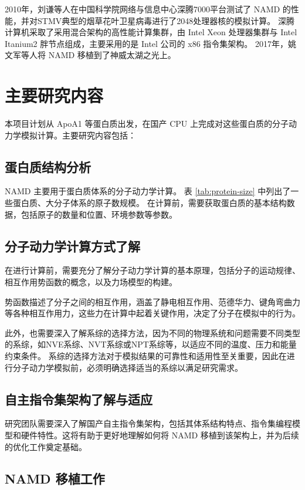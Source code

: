 2010年，刘谦等人在中国科学院网络与信息中心深腾7000平台测试了 NAMD 的性能，并对STMV典型的烟草花叶卫星病毒进行了2048处理器核的模拟计算\cite{刘倩2010基于深腾}。
深腾计算机采取了采用混合架构的高性能计算集群，由 Intel Xeon 处理器集群与 Intel Itanium2 胖节点组成，主要采用的是 Intel 公司的 x86 指令集架构。
2017年，姚文军\cite{姚文军2017基于神威太湖之光的}等人将 NAMD 移植到了神威太湖之光上。

\section{主要研究内容}

本项目计划从 ApoA1 等蛋白质出发，在国产 CPU 上完成对这些蛋白质的分子动力学模拟计算。主要研究内容包括：

\subsection{蛋白质结构分析}

NAMD 主要用于蛋白质体系的分子动力学计算。
表 \ref{tab:protein-size} 中列出了一些蛋白质、大分子体系的原子数规模。
在计算前，需要获取蛋白质的基本结构数据，包括原子的数量和位置、环境参数等参数。

\subsection{分子动力学计算方式了解}

在进行计算前，需要充分了解分子动力学计算的基本原理，包括分子的运动规律、相互作用势函数的概念，以及力场模型的构建。

势函数描述了分子之间的相互作用，涵盖了静电相互作用、范德华力、键角弯曲力等各种相互作用力，这些力在计算中起着关键作用，决定了分子在模拟中的行为。

此外，也需要深入了解系综的选择方法，因为不同的物理系统和问题需要不同类型的系综，如NVE系综、NVT系综或NPT系综等，以适应不同的温度、压力和能量约束条件。
系综的选择方法对于模拟结果的可靠性和适用性至关重要，因此在进行分子动力学模拟前，必须明确选择适当的系综以满足研究需求。

\subsection{自主指令集架构了解与适应}

研究团队需要深入了解国产自主指令集架构，包括其体系结构特点、指令集编程模型和硬件特性。这将有助于更好地理解如何将 NAMD 移植到该架构上，并为后续的优化工作奠定基础。

\subsection{NAMD 移植工作}

